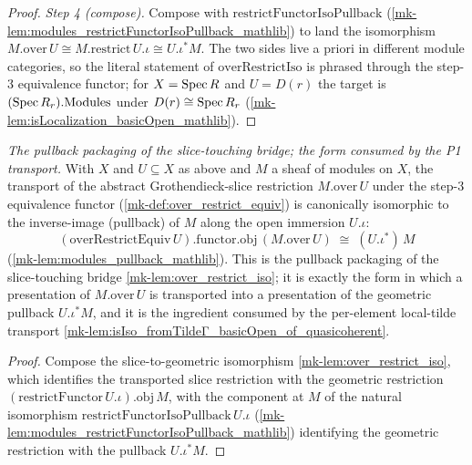 \begin{proof}
  \emph{Step 4 (compose).} Compose with
  \(\mathrm{restrictFunctorIsoPullback}\) (\ref{mk-lem:modules_restrictFunctorIsoPullback_mathlib})
  to land the isomorphism \(M.\mathrm{over}\,U \cong M.\mathrm{restrict}\,U.\iota \cong
  U.\iota^{*}M\). The two sides live a priori in different module categories, so the literal
  statement of \(\mathrm{overRestrictIso}\) is phrased through the step-3 equivalence functor; for
  \(X = \operatorname{Spec} R\) and \(U = D(r)\) the target is \((\operatorname{Spec} R_r).\mathrm{Modules}\) under
  \(D(r) \cong \operatorname{Spec} R_r\) (\ref{mk-lem:isLocalization_basicOpen_mathlib}).
\end{proof}

\begin{lemma}\label{mk-lem:over_restrict_pullback_iso}
  \leanok

  \textit{The pullback packaging of the slice-touching bridge; the form consumed by the P1 transport.}
  With \(X\) and \(U \subseteq X\) as above and \(M\) a sheaf of modules on \(X\), the transport of the
  abstract Grothendieck-slice restriction \(M.\mathrm{over}\,U\) under the step-3 equivalence functor
  (\ref{mk-def:over_restrict_equiv}) is canonically isomorphic to the inverse-image (pullback) of \(M\)
  along the open immersion \(U.\iota\):
  \[
    (\mathrm{overRestrictEquiv}\,U).\mathrm{functor}.\mathrm{obj}\,(M.\mathrm{over}\,U)
      \;\cong\; (U.\iota^{*})\,M
  \]
  (\ref{mk-lem:modules_pullback_mathlib}). This is the pullback packaging of the slice-touching bridge
  \ref{mk-lem:over_restrict_iso}; it is exactly the form in which a presentation of
  \(M.\mathrm{over}\,U\) is transported into a presentation of the geometric pullback \(U.\iota^{*}M\),
  and it is the ingredient consumed by the per-element local-tilde transport
  \ref{mk-lem:isIso_fromTildeΓ_basicOpen_of_quasicoherent}.
\end{lemma}
\begin{proof}
  Compose the slice-to-geometric isomorphism \ref{mk-lem:over_restrict_iso}, which identifies the
  transported slice restriction with the geometric restriction
  \((\mathrm{restrictFunctor}\,U.\iota).\mathrm{obj}\,M\), with the component at \(M\) of the natural
  isomorphism \(\mathrm{restrictFunctorIsoPullback}\,U.\iota\)
  (\ref{mk-lem:modules_restrictFunctorIsoPullback_mathlib}) identifying the geometric restriction with
  the pullback \(U.\iota^{*}M\).
\end{proof}

